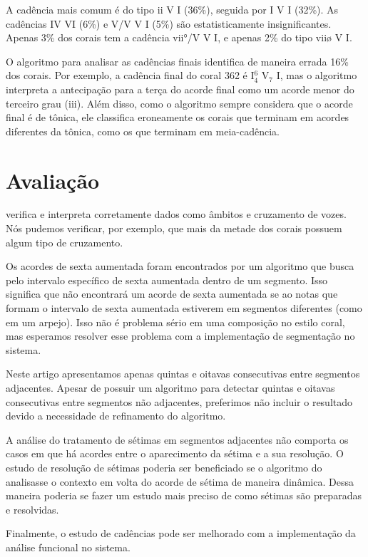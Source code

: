 A cadência mais comum é do tipo ii V I (36\%), seguida por I V I
(32\%). As cadências IV VI (6\%) e V/V V I (5\%) são estatisticamente
insignificantes. Apenas 3\% dos corais tem a cadência vii°/V V I, e
apenas 2\% do tipo viiø V I.

O algoritmo para analisar as cadências finais identifica de maneira
errada 16\% dos corais. Por exemplo, a cadência final do coral 362 é
I$^6_4$ V$_7$ I, mas o algoritmo interpreta a antecipação para a terça
do acorde final como um acorde menor do terceiro grau (iii). Além
disso, como o algoritmo sempre considera que o acorde final é de
tônica, ele classifica eroneamente os corais que terminam em acordes
diferentes da tônica, como os que terminam em meia-cadência.

\section{Avaliação}
\label{sec:avaliacao}

\rameau{} verifica e interpreta corretamente dados como âmbitos e
cruzamento de vozes. Nós pudemos verificar, por exemplo, que mais da
metade dos corais possuem algum tipo de cruzamento.

Os acordes de sexta aumentada foram encontrados por um algoritmo que
busca pelo intervalo específico de sexta aumentada dentro de um
segmento. Isso significa que \rameau{} não encontrará um acorde de
sexta aumentada se ao notas que formam o intervalo de sexta aumentada
estiverem em segmentos diferentes (como em um arpejo). Isso não é
problema sério em uma composição no estilo coral, mas esperamos
resolver esse problema com a implementação de segmentação no sistema.

Neste artigo apresentamos apenas quintas e oitavas consecutivas entre
segmentos adjacentes. Apesar de \rameau{} possuir um algoritmo para
detectar quintas e oitavas consecutivas entre segmentos não
adjacentes, preferimos não incluir o resultado devido a necessidade de
refinamento do algoritmo.

A análise do tratamento de sétimas em segmentos adjacentes não
comporta os casos em que há acordes entre o aparecimento da sétima e a
sua resolução. O estudo de resolução de sétimas poderia ser
beneficiado se o algoritmo do \rameau{} analisasse o contexto em volta
do acorde de sétima de maneira dinâmica. Dessa maneira poderia se
fazer um estudo mais preciso de como sétimas são preparadas e
resolvidas.

Finalmente, o estudo de cadências pode ser melhorado com a
implementação da análise funcional no sistema.

